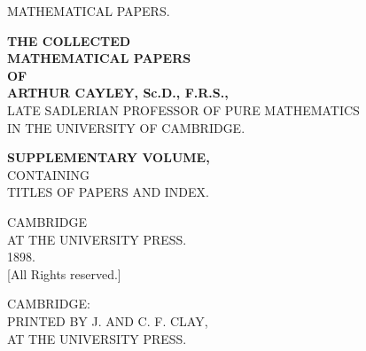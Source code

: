 \documentclass[11pt,a4paper]{article}
\begin{document}
\thispagestyle{empty}
\begin{center}
\vspace*{2cm}

{\Large MATHEMATICAL PAPERS.}

\vspace{3cm}

{\LARGE\bfseries THE COLLECTED}\\[0.5em]
{\LARGE\bfseries MATHEMATICAL PAPERS}\\[0.5em]
{\large\bfseries OF}\\[0.5em]
{\LARGE\bfseries ARTHUR CAYLEY, Sc.D., F.R.S.,}\\[0.5em]
{\normalsize LATE SADLERIAN PROFESSOR OF PURE MATHEMATICS}\\
{\normalsize IN THE UNIVERSITY OF CAMBRIDGE.}

\vspace{1.5cm}

{\large\bfseries SUPPLEMENTARY VOLUME,}\\[0.3em]
{\normalsize CONTAINING}\\[0.3em]
{\large TITLES OF PAPERS AND INDEX.}

\vspace{2cm}

{\large CAMBRIDGE}\\
{\normalsize AT THE UNIVERSITY PRESS.}\\
{\normalsize 1898.}\\[0.3em]
{\small [All Rights reserved.]}

\vfill

{\small CAMBRIDGE:}\\
{\small PRINTED BY J. AND C. F. CLAY,}\\
{\small AT THE UNIVERSITY PRESS.}

\end{center}

\newpage
\end{document}
